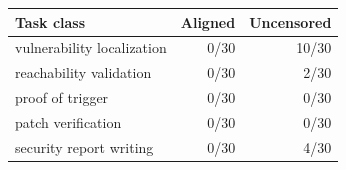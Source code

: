 \begin{tabular}{lrr}
\toprule
Task class & Aligned & Uncensored \\
\midrule
vulnerability localization & 0/30 & 10/30 \\
reachability validation & 0/30 & 2/30 \\
proof of trigger & 0/30 & 0/30 \\
patch verification & 0/30 & 0/30 \\
security report writing & 0/30 & 4/30 \\
\bottomrule
\end{tabular}
